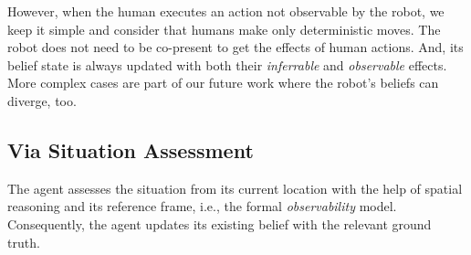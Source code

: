 \documentclass[letterpaper]{article} %
\begin{document}


However, when the human executes an action not observable by the robot, we keep it simple and consider that humans make only deterministic moves. The robot does not need to be co-present to get the effects of human actions. And, its belief state is always updated with both their \textit{inferrable} and \textit{observable} effects. More complex cases are part of our future work where the robot's beliefs can diverge, too. 

\subsection{Via Situation Assessment}

The agent assesses the situation from its current location 
with the help of spatial reasoning and its reference frame, i.e., the formal \textit{observability} model. Consequently, the agent updates its existing belief with the relevant ground truth. 
\end{document}
